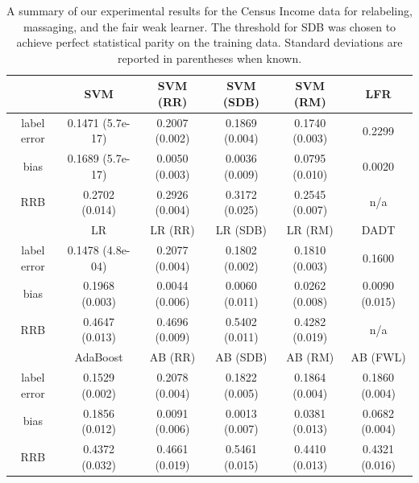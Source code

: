 \documentclass[twoside,leqno,twocolumn]{article}
\begin{document}
\begin{table}[t]
\centering
\begin{tabular}{| c | ccccc |}
\hline
               & SVM & SVM (RR) & SVM (SDB) & SVM (RM) & LFR \cite{ZemelWSPD13} \\
\hline
label error    & 0.1471 (5.7e-17) & 0.2007 (0.002) & 0.1869 (0.004) & 0.1740 (0.003) & 0.2299 \\
bias           & 0.1689 (5.7e-17) & 0.0050 (0.003) & 0.0036 (0.009) & 0.0795 (0.010) & 0.0020 \\
RRB            & 0.2702 (0.014) & 0.2926 (0.004) & 0.3172 (0.025) & 0.2545 (0.007) & n/a \\
\hline
               & LR & LR (RR) & LR (SDB) & LR (RM) & DADT \cite{KamiranCP10} \\
\hline
label error    & 0.1478 (4.8e-04) & 0.2077 (0.004) & 0.1802 (0.002) & 0.1810 (0.003) & 0.1600 \\
bias           & 0.1968 (0.003) & 0.0044 (0.006) & 0.0060 (0.011) & 0.0262 (0.008) & 0.0090 (0.015) \\
RRB            & 0.4647 (0.013) & 0.4696 (0.009) & 0.5402 (0.011) & 0.4282 (0.019) & n/a \\
\hline
               & AdaBoost & AB (RR) & AB (SDB) & AB (RM) & AB (FWL)  \\
\hline
label error    & 0.1529 (0.002) & 0.2078 (0.004) & 0.1822 (0.005) & 0.1864 (0.004) & 0.1860 (0.004) \\
bias           & 0.1856 (0.012) & 0.0091 (0.006) & 0.0013 (0.007) & 0.0381 (0.013) & 0.0682 (0.004)  \\
RRB            & 0.4372 (0.032) & 0.4661 (0.019) & 0.5461 (0.015) & 0.4410 (0.013) & 0.4321 (0.016)  \\
\hline
\hline
\end{tabular}
\caption{A summary of our experimental results for the Census Income data for
relabeling, massaging, and the fair weak learner. The threshold for SDB was
chosen to achieve perfect statistical parity on the training data. Standard
deviations are reported in parentheses when known.}
\label{table:census_results}
\end{table}
\end{document}

